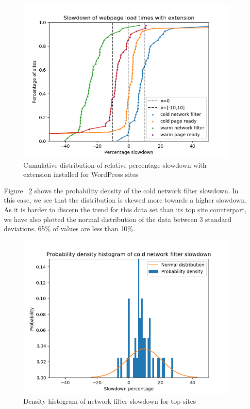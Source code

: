 \begin{figure}[h]
	\includegraphics[scale=0.5]{results/extension_slowdown_wordpress.png}
	\caption{Cumulative distribution of relative percentage slowdown with extension installed for WordPress sites}
	\label{fig:wordpress_slowdown}
\end{figure}

Figure ~\ref{fig:histogram_slowdown_wordpress} shows the probability density of the cold network filter slowdown. In this case, we see that the distribution is skewed more towards a higher slowdown. As it is harder to discern the trend for this data set than its top site counterpart, we have also plotted the normal distribution of the data between 3 standard deviations. 65\% of values are less than 10\%.

\begin{figure}[h]
	\includegraphics[scale=0.5]{results/density_histogram_filter_slowdown_wordpress.png}
	\caption{Density histogram of network filter slowdown for top sites}
	\label{fig:histogram_slowdown_wordpress}
\end{figure}

